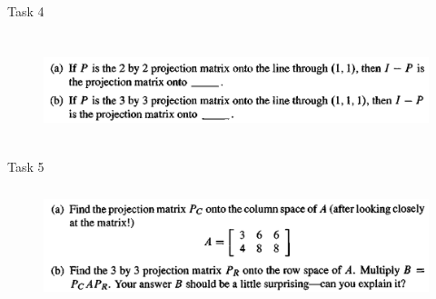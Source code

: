 \documentclass[aspectratio=169]{beamer}
\begin{document}
    \begin{frame}[t]{Task 4}
        \framesubtitle{}
        \begin{figure}[H]
            \centering\includegraphics[height=3cm,width=1\textwidth,keepaspectratio]{4.png}
            \label{fig:4.png}
        \end{figure}
    \end{frame}

    \begin{frame}[t]{Task 5}
        \framesubtitle{}
        \begin{figure}[H]
            \centering\includegraphics[height=3cm,width=1\textwidth,keepaspectratio]{5.png}
            \label{fig:5.png}
        \end{figure}
    \end{frame}
    
\end{document}
